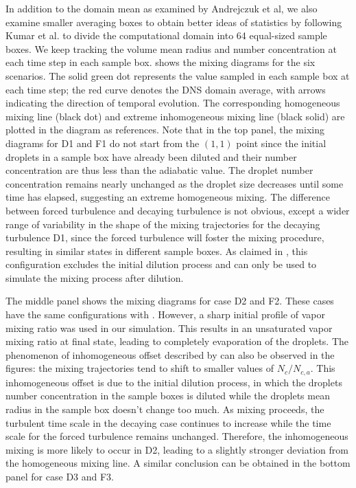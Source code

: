 In addition to the domain mean as examined by Andrejczuk et al, we also examine smaller averaging boxes to obtain better ideas of statistics by following Kumar et al. \cite{Kumar14} to divide the computational domain into 64 equal-sized sample boxes. We keep tracking the volume mean radius and number concentration at each time step in each sample box.  shows the mixing diagrams for the six scenarios. The solid green dot represents the value sampled in each sample box at each time step; the red curve denotes the DNS domain average, with arrows indicating the direction of temporal evolution. The corresponding homogeneous mixing line (black dot) and extreme inhomogeneous mixing line (black solid) are plotted in the diagram as references. Note that in the top panel, the mixing diagrams for D1 and F1 do not start from the $(1,1)$ point since the initial droplets in a sample box have already been diluted and their number concentration are thus less than the adiabatic value. The droplet number concentration remains nearly unchanged as the droplet size decreases until some time has elapsed, suggesting an extreme homogeneous mixing.  The difference between forced turbulence and decaying turbulence is not obvious, except a wider range of variability in the shape of the mixing trajectories for the decaying turbulence D1, since the forced turbulence will foster the mixing procedure, resulting in similar states in different sample boxes. As claimed in \cite{And04}, this configuration excludes the initial dilution process and can only be used to simulate the mixing process after dilution.

The middle panel shows the mixing diagrams for case D2 and F2. These cases have the same configurations with \cite{Kumar14}. However, a sharp initial profile of vapor mixing ratio was used in our simulation. This results in an unsaturated vapor mixing ratio at final state, leading to completely evaporation of the droplets. The phenomenon of inhomogeneous offset described by \cite{Kumar14} can also be observed in the figures: the mixing trajectories tend to shift to smaller values of $N_c/N_{c,a}$. This inhomogeneous offset is due to the initial dilution process, in which the droplets number concentration in the sample boxes is diluted while the droplets mean radius in the sample box doesn't change too much. As mixing proceeds, the turbulent time scale in the decaying case continues to increase while the time scale for the forced turbulence remains unchanged. Therefore, the inhomogeneous mixing is more likely to occur in D2, leading to a slightly stronger deviation from the homogeneous mixing line.  A similar conclusion can be obtained in the bottom panel for case D3 and F3. 

